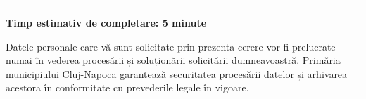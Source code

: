 \documentclass[11pt,a4paper]{article}
\begin{document}
\vspace{0.3cm}
\hrule
\vspace{0.2cm}

{\footnotesize
\textbf{Timp estimativ de completare: 5 minute}

\vspace{0.2cm}

Datele personale care vă sunt solicitate prin prezenta cerere vor fi prelucrate numai în vederea procesării și soluționării solicitării dumneavoastră. Primăria municipiului Cluj-Napoca garantează securitatea procesării datelor și arhivarea acestora în conformitate cu prevederile legale în vigoare.
}
\end{document}
